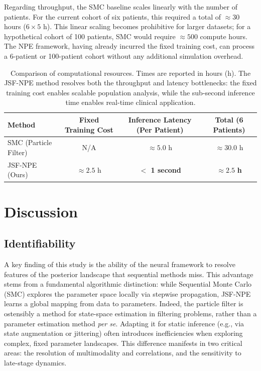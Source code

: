 \documentclass{article}
\begin{document}
Regarding throughput, the SMC baseline scales linearly with the number of patients. For the current cohort of six patients, this required a total of $\approx 30$ hours ($6 \times 5$ h). This linear scaling becomes prohibitive for larger datasets; for a hypothetical cohort of 100 patients, SMC would require $\approx 500$ compute hours. The NPE framework, having already incurred the fixed training cost, can process a 6-patient or 100-patient cohort without any additional simulation overhead.


\begin{table}[htbp]
\centering
\caption{Comparison of computational resources. Times are reported in hours (h). The JSF-NPE method resolves both the throughput and latency bottlenecks: the fixed training cost enables scalable population analysis, while the sub-second inference time enables real-time clinical application.}
\label{tab:runtime}
\begin{tabular}{@{}lccc@{}}
\toprule
\textbf{Method} & \textbf{Fixed Training Cost} & \textbf{Inference Latency (Per Patient)} & \textbf{Total (6 Patients)} \\
\midrule
SMC (Particle Filter) & N/A & $\approx 5.0$ h & $\approx 30.0$ h \\
JSF-NPE (Ours) & $\approx 2.5$ h & \textbf{$<$ 1 second} & $\mathbf{\approx 2.5}$ \textbf{h} \\
\bottomrule
\end{tabular}
\end{table}





\section{Discussion}

\subsection{Identifiability}\label{sec:identifiability}

A key finding of this study is the ability of the neural framework to resolve features of the posterior landscape that sequential methods miss. This advantage stems from a fundamental algorithmic distinction: while Sequential Monte Carlo (SMC) explores the parameter space locally via stepwise propagation, JSF-NPE learns a global mapping from data to parameters. Indeed, the particle filter is ostensibly a method for state-space estimation in filtering problems, rather than a parameter estimation method \textit{per se}. Adapting it for static inference (e.g., via state augmentation or jittering) often introduces inefficiencies when exploring complex, fixed parameter landscapes. This difference manifests in two critical areas: the resolution of multimodality and correlations, and the sensitivity to late-stage dynamics.
\end{document}
